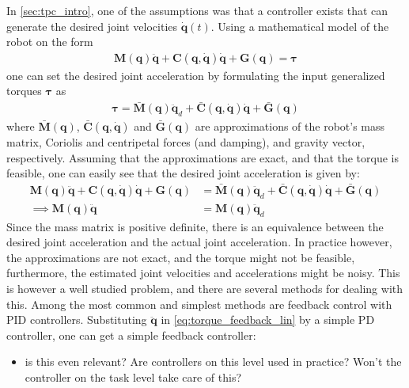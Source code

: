 In \autoref{sec:tpc_intro}, one of the assumptions was that a controller exists
that can generate the desired joint velocities $\dot{\bm{q}}(t)$. Using a
mathematical model of the robot on the form
\begin{align}
    \bm{M}(\bm{q}) \ddot{\bm{q}} + \bm{C}(\bm{q}, \dot{\bm{q}}) \dot{\bm{q}} + \bm{G}(\bm{q}) = \bm{\tau}
\end{align}
one can set the desired joint acceleration by formulating the input generalized
torques $\bm{\tau}$ as
\begin{align}
    \bm{\tau} = \bar{\bm{M}}(\bm{q}) \ddot{\bm{q}}_d + \bar{\bm{C}}(\bm{q}, \dot{\bm{q}}) \dot{\bm{q}} + \bar{\bm{G}}(\bm{q}) \label{eq:torque_feedback_lin}
\end{align}
where $\bar{\bm{M}}(\bm{q})$, $\bar{\bm{C}}(\bm{q}, \dot{\bm{q}})$ and
$\bar{\bm{G}}(\bm{q})$ are approximations of the robot's mass matrix, Coriolis
and centripetal forces (and damping), and gravity vector, respectively. Assuming
that the approximations are exact, and that the torque is feasible, one can easily
see that the desired joint acceleration is given by:
\begin{subequations}
\begin{align}
    \bm{M}(\bm{q}) \ddot{\bm{q}} + \bm{C}(\bm{q}, \dot{\bm{q}}) \dot{\bm{q}} + \bm{G}(\bm{q}) &= 
    \bar{\bm{M}}(\bm{q}) \ddot{\bm{q}}_d + \bar{\bm{C}}(\bm{q}, \dot{\bm{q}}) \dot{\bm{q}} + \bar{\bm{G}}(\bm{q}) \\
    \implies \bm{M}(\bm{q}) \ddot{\bm{q}} &= \bm{M}(\bm{q}) \ddot{\bm{q}}_d
\end{align}
\end{subequations}
Since the mass matrix is positive definite, there is an equivalence between the
desired joint acceleration and the actual joint acceleration. In practice
however, the approximations are not exact, and the torque might not be feasible,
furthermore, the estimated joint velocities and accelerations might be noisy.
This is however a well studied problem, and there are several methods for
dealing with this. Among the most common and simplest methods are feedback control
with PID controllers. Substituting $\ddot{\bm{q}}$ in \autoref{eq:torque_feedback_lin}
by a simple PD controller, one can get a simple feedback controller:
{
    \color{red}
    \begin{itemize}
        \item is this even relevant? Are controllers on this level used in practice?
            Won't the controller on the task level take care of this?
    \end{itemize}
}


